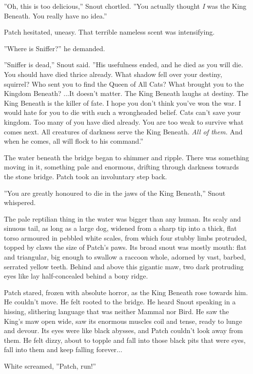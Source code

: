 \documentclass[12pt]{book}
\begin{document}
''Oh, this is too delicious,'' Snout chortled. ''You actually thought {\it I} was the King Beneath. You really have no idea.''

Patch hesitated, uneasy. That terrible nameless scent was intensifying.

''Where is Sniffer?'' he demanded.

''Sniffer is dead,'' Snout said. ''His usefulness ended, and he died as you will die. You should have died thrice already. What shadow fell over your destiny, squirrel? Who sent you to find the Queen of All Cats? What brought you to the Kingdom Beneath? ...It doesn't matter. The King Beneath laughs at destiny. The King Beneath is the killer of fate. I hope you don't think you've won the war. I would hate for you to die with such a wrongheaded belief. Cats can't save your kingdom. Too many of you have died already. You are too weak to survive what comes next. All creatures of darkness serve the King Beneath. {\it All of them.} And when he comes, all will flock to his command.''

The water beneath the bridge began to shimmer and ripple. There was something moving in it, something pale and enormous, drifting through darkness towards the stone bridge. Patch took an involuntary step back.

''You are greatly honoured to die in the jaws of the King Beneath,'' Snout whispered.

The pale reptilian thing in the water was bigger than any human. Its scaly and sinuous tail, as long as a large dog, widened from a sharp tip into a thick, flat torso armoured in pebbled white scales, from which four stubby limbs protruded, topped by claws the size of Patch's paws. Its broad snout was mostly mouth: flat and triangular, big enough to swallow a raccoon whole, adorned by vast, barbed, serrated yellow teeth. Behind and above this gigantic maw, two dark protruding eyes like lay half-concealed behind a bony ridge.

Patch stared, frozen with absolute horror, as the King Beneath rose towards him. He couldn't move. He felt rooted to the bridge. He heard Snout speaking in a hissing, slithering language that was neither Mammal nor Bird. He saw the King's maw open wide, saw its enormous muscles coil and tense, ready to lunge and devour. Its eyes were like black abysses, and Patch couldn't look away from them. He felt dizzy, about to topple and fall into those black pits that were eyes, fall into them and keep falling forever...

White screamed, ''Patch, run!''
\end{document}
